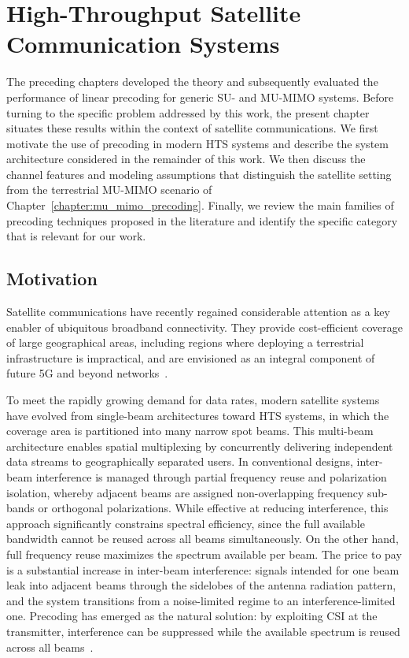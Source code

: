 \chapter{High-Throughput Satellite Communication Systems}
\label{chapter:hts_communication_systems}

The preceding chapters developed the theory and subsequently evaluated the performance of linear precoding for generic \ac{SU}- and \ac{MU}-\ac{MIMO} systems. Before turning to the specific problem addressed by this work, the present chapter situates these results within the context of satellite communications.
We first motivate the use of precoding in modern \acf{HTS} systems and describe the system architecture considered in the remainder of this work. We then discuss the channel features and modeling assumptions that distinguish the satellite setting from the terrestrial \ac{MU}-\ac{MIMO} scenario of Chapter~\ref{chapter:mu_mimo_precoding}. Finally, we review the main families of precoding techniques proposed in the literature and identify the specific category that is relevant for our work.


\section{Motivation}
\label{section:hts_motivation}

Satellite communications have recently regained considerable attention as a key enabler of ubiquitous broadband connectivity. 
They provide cost-efficient coverage of large geographical areas, including regions where deploying a terrestrial infrastructure is impractical, and are envisioned as an integral component of future 5G and beyond networks~\cite{1_signal_processing_for_satellites, 6_satellites_in_new_space_era}.

To meet the rapidly growing demand for data rates, modern satellite systems have evolved from single-beam architectures toward \acf{HTS} systems, in which the coverage area is partitioned into many narrow spot beams. 
This multi-beam architecture enables spatial multiplexing by concurrently delivering independent data streams to geographically separated users.
In conventional designs, inter-beam interference is managed through partial frequency reuse and polarization isolation, whereby adjacent beams are assigned non-overlapping frequency sub-bands or orthogonal polarizations.
While effective at reducing interference, this approach significantly constrains spectral efficiency, since the full available bandwidth cannot be reused across all beams simultaneously.
On the other hand, full frequency reuse maximizes the spectrum available per beam. The price to pay is a substantial increase in inter-beam interference: signals intended for one beam leak into adjacent beams through the sidelobes of the antenna radiation pattern, and the system transitions from a noise-limited regime to an interference-limited one.
Precoding has emerged as the natural solution: by exploiting \ac{CSI} at the transmitter, interference can be suppressed while the available spectrum is reused across all beams~\cite{1_signal_processing_for_satellites}.


